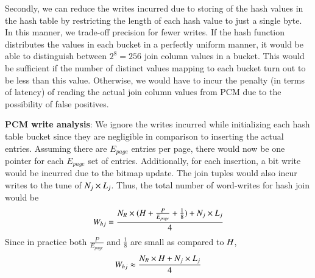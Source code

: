 Secondly, we can reduce the writes incurred due to storing of the hash values in
the hash table by restricting the length of each hash value to just a single byte. In this
manner, we trade-off precision for fewer writes. If the hash function
distributes the values in each bucket in a perfectly uniform manner, it
would be able to distinguish between $2^8 = 256$ join column values in a
bucket. This would be sufficient if the number of distinct values mapping
to each bucket turn out to be less than this value. Otherwise, we would
have to incur the penalty (in terms of latency) of reading the actual join
column values from PCM due to the possibility of false positives.

\textbf{PCM write analysis}: We ignore the writes incurred while initializing each hash table bucket since they are negligible in comparison to inserting the actual entries. Assuming there are $E_{page}$ entries per page, there would now be one pointer for each $E_{page}$ set of entries. Additionally, for each insertion, a bit write would be incurred due to the bitmap update. The join tuples would also incur writes to the tune of $N_j \times L_j$. Thus, the total number of word-writes for hash join would be
$$W_{hj} = \frac{N_R \times (H +  \frac{P}{E_{page}} + \frac{1}{8} ) + N_j \times L_j }{4}$$
Since in practice both  $\frac{P}{E_{page}}$ and $\frac{1}{8}$ are small as compared to $H$, 
\vspace{-0.05in}
\begin{equation}\label{eq:hj}
 W_{hj} \approx \frac{ N_R \times H + N_j \times L_j}{4} 
\end{equation} 
